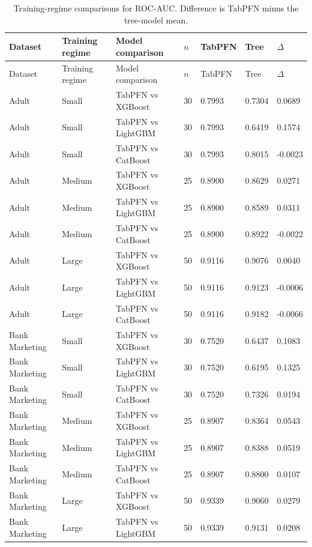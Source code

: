 \begingroup
\footnotesize
\setlength{\tabcolsep}{2.5pt}
\renewcommand{\arraystretch}{1.02}
\begin{longtable}{p{2.35cm}p{1.9cm}p{3.3cm}R{0.55cm}R{1.25cm}R{1.15cm}R{1.15cm}}
\caption{Training-regime comparisons for ROC-AUC. Difference is TabPFN minus the tree-model mean.}\label{tab:training-regimes}\\
\toprule
Dataset & Training regime & Model comparison & $n$ & TabPFN & Tree & $\Delta$ \\
\midrule
\endfirsthead
\toprule
Dataset & Training regime & Model comparison & $n$ & TabPFN & Tree & $\Delta$ \\
\midrule
\endhead
Adult & Small & TabPFN vs XGBoost & 30 & 0.7993 & 0.7304 & 0.0689 \\
Adult & Small & TabPFN vs LightGBM & 30 & 0.7993 & 0.6419 & 0.1574 \\
Adult & Small & TabPFN vs CatBoost & 30 & 0.7993 & 0.8015 & -0.0023 \\
Adult & Medium & TabPFN vs XGBoost & 25 & 0.8900 & 0.8629 & 0.0271 \\
Adult & Medium & TabPFN vs LightGBM & 25 & 0.8900 & 0.8589 & 0.0311 \\
Adult & Medium & TabPFN vs CatBoost & 25 & 0.8900 & 0.8922 & -0.0022 \\
Adult & Large & TabPFN vs XGBoost & 50 & 0.9116 & 0.9076 & 0.0040 \\
Adult & Large & TabPFN vs LightGBM & 50 & 0.9116 & 0.9123 & -0.0006 \\
Adult & Large & TabPFN vs CatBoost & 50 & 0.9116 & 0.9182 & -0.0066 \\
Bank Marketing & Small & TabPFN vs XGBoost & 30 & 0.7520 & 0.6437 & 0.1083 \\
Bank Marketing & Small & TabPFN vs LightGBM & 30 & 0.7520 & 0.6195 & 0.1325 \\
Bank Marketing & Small & TabPFN vs CatBoost & 30 & 0.7520 & 0.7326 & 0.0194 \\
Bank Marketing & Medium & TabPFN vs XGBoost & 25 & 0.8907 & 0.8364 & 0.0543 \\
Bank Marketing & Medium & TabPFN vs LightGBM & 25 & 0.8907 & 0.8388 & 0.0519 \\
Bank Marketing & Medium & TabPFN vs CatBoost & 25 & 0.8907 & 0.8800 & 0.0107 \\
Bank Marketing & Large & TabPFN vs XGBoost & 50 & 0.9339 & 0.9060 & 0.0279 \\
Bank Marketing & Large & TabPFN vs LightGBM & 50 & 0.9339 & 0.9131 & 0.0208 \\

\end{longtable}
